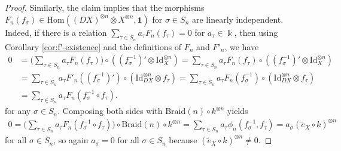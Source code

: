 \documentclass[11pt, reqno]{amsart}
\theoremstyle{definition}\newtheorem{defi}[thm]{Definition}
\theoremstyle{definition}\newtheorem{rem}[thm]{Remark}
\theoremstyle{definition}\newtheorem{exam}[thm]{Example}
\theoremstyle{definition}\newtheorem{assum}[thm]{Assumption}
\newcommand{\til}{\widetilde}
\newcommand{\Id}{\mathrm{Id}}
\newcommand{\vac}{\mathbf{1}}
\begin{document}
\begin{proof}
Similarly, the claim implies that the morphisms $F_{n}(f_\sigma)\in\mathrm{Hom}((DX)^{\otimes n}\otimes X^{\otimes n},\vac)$ for $\sigma\in S_n$ are linearly independent. Indeed, if there is a relation $\sum_{\tau\in S_n} a_\tau F_{n}(f_\tau)=0$ for $a_\tau\in\Bbbk$, then using Corollary \ref{cor:f'-existence} and the definitions of $F_{n}$ and $F'_{n}$, we have
\begin{align*}
0 & =\bigg(\sum_{\tau\in S_n} a_\tau F_{n}(f_\tau)\bigg)\circ((f_\sigma^{-1})'\otimes\Id_X^{\otimes n}) =\sum_{\tau\in S_n} a_\tau F_{n}(f_\tau)\circ((f_\sigma^{-1})'\otimes\Id_X^{\otimes n})\\
& =\sum_{\tau\in S_n} a_\tau F'_{n}((f_\sigma^{-1})')\circ(\Id_{DX}^{\otimes n}\otimes f_\tau) = \sum_{\tau\in S_n} a_\tau F_{n}(f_\sigma^{-1})\circ(\Id_{DX}^{\otimes n}\otimes f_\tau)\\
& =\sum_{\tau\in S_n} a_\tau F_{n}(f_\sigma^{-1}\circ f_\tau).
\end{align*}
 for any $\sigma\in S_n$. Composing both sides with $\mathrm{Braid}(n)\circ k^{\otimes n}$ yields
\begin{align*}
0=\bigg(\sum_{\tau\in S_n} a_\tau F_n(f_\sigma^{-1}\circ f_\tau)\bigg)\circ\mathrm{Braid}(n)\circ k^{\otimes n} = \sum_{\tau\in S_n} a_\tau \phi_{n}(f_\sigma^{-1},f_\tau) = a_\sigma (\til{e}_X\circ k)^{\otimes n}
\end{align*}
for all $\sigma\in S_n$, so again $a_\sigma=0$ for all $\sigma\in S_n$ because $(\til{e}_X\circ k)^{\otimes n}\neq 0$.


\end{proof}
\end{document}
